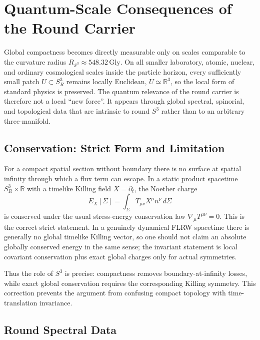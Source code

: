 \documentclass[aps,prd,onecolumn,superscriptaddress,longbibliography,nofootinbib,notitlepage]{revtex4-2}
\begin{document}
\section{Quantum-Scale Consequences of the Round Carrier}
\label{sec:quantum-s3-carrier}

Global compactness becomes directly measurable only on scales comparable to the
curvature radius $R_{\mathcal S^3}\approx548.32\,\mathrm{Gly}$. On all smaller
laboratory, atomic, nuclear, and ordinary cosmological scales inside the particle
horizon, every sufficiently small patch $U\subset S^3_R$ remains locally
Euclidean, $U\simeq\mathbb R^3$, so the local form of standard physics is
preserved. The quantum relevance of the round carrier is therefore not a local
``new force''. It appears through global spectral, spinorial, and topological
data that are intrinsic to round $S^3$ rather than to an arbitrary
three-manifold.

\subsection{Conservation: Strict Form and Limitation}

For a compact spatial section without boundary there is no surface at spatial
infinity through which a flux term can escape. In a static product spacetime
$S^3_R\times\mathbb R$ with a timelike Killing field $X=\partial_t$, the Noether
charge
\begin{equation}
  E_X[\Sigma]
  =\int_{\Sigma}\! T_{\mu\nu}X^\mu n^\nu\,d\Sigma
\end{equation}
is conserved under the usual stress-energy conservation law
$\nabla_\mu T^{\mu\nu}=0$. This is the correct strict statement. In a genuinely
dynamical FLRW spacetime there is generally no global timelike Killing vector,
so one should not claim an absolute globally conserved energy in the same sense;
the invariant statement is local covariant conservation plus exact global
charges only for actual symmetries.

Thus the role of $S^3$ is precise: compactness removes boundary-at-infinity
losses, while exact global conservation requires the corresponding Killing
symmetry. This correction prevents the argument from confusing compact topology
with time-translation invariance.


\subsection{Round Spectral Data}
\label{sec:round-spectral-data}
\end{document}
